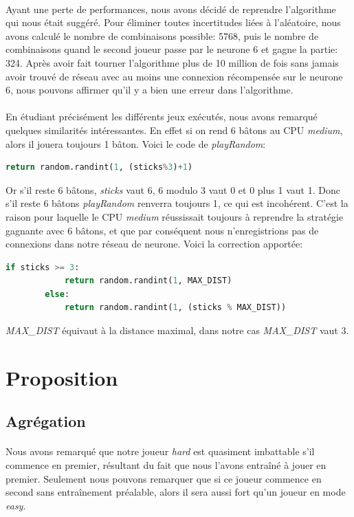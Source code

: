 \documentclass{article}
\begin{document}
  \paragraph{}
    Ayant une perte de performances, nous avons décidé de reprendre l'algorithme qui nous était suggéré. Pour éliminer toutes incertitudes liées à l'aléatoire,
    nous avons calculé le nombre de combinaisons possible: 5768, puis le nombre de combinaisons quand le second joueur passe par le neurone 6 et gagne la partie: 324.
    Après avoir fait tourner l'algorithme plus de 10 million de fois sans jamais avoir trouvé de réseau avec au moins une connexion récompensée sur le neurone 6, 
    nous pouvons affirmer qu'il y a bien une erreur dans l'algorithme.
  \paragraph{}
    En étudiant précisément les différents jeux exécutés, nous avons remarqué quelques similarités intéressantes. En effet si on rend 6 bâtons au CPU \emph{medium},
    alors il jouera toujours 1 bâton. Voici le code de \emph{playRandom}:
    \begin{lstlisting}[language=python]
    	return random.randint(1, (sticks%3)+1)
    \end{lstlisting}
    Or s'il reste 6 bâtons, \emph{sticks} vaut 6, 6 modulo 3 vaut 0 et 0 plus 1 vaut 1. Donc s'il reste 6 bâtons \emph{playRandom} renverra toujours 1, ce qui est incohérent.
    C'est la raison pour laquelle le CPU \emph{medium} réussissait toujours à reprendre la stratégie gagnante avec 6 bâtons, et que par conséquent nous n'enregistrions pas de connexions
    dans notre réseau de neurone.
    Voici la correction apportée:
    \begin{lstlisting}[language=python]
    	if sticks >= 3:
            return random.randint(1, MAX_DIST)
        else:
            return random.randint(1, (sticks % MAX_DIST))
    \end{lstlisting}
    \emph{MAX\_DIST} équivaut à la distance maximal, dans notre cas \emph{MAX\_DIST} vaut 3.
\newpage

\section{Proposition}
  \subsection{Agrégation}
  \paragraph{} 
    Nous avons remarqué que notre joueur \emph{hard} est quasiment imbattable s'il commence en premier,
    résultant du fait que nous l'avons entraîné à jouer en premier. Seulement nous pouvons remarquer que si ce joueur commence 
    en second sans entraînement préalable, alors il sera aussi fort qu'un joueur en mode \emph{easy}.
\end{document}
